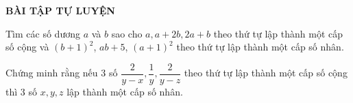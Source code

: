 \begin{center}
	\textbf{BÀI TẬP TỰ LUYỆN}
\end{center}
\begin{bt}%
	Tìm các số dương $a$ và $b$ sao cho $a, a+2b, 2a+b$ theo thứ tự lập thành một cấp số cộng và ${(b+1)}^2$, $ab+5$, ${(a+1)}^2$ theo thứ tự lập thành một cấp số nhân. 
\end{bt}
\begin{bt}%
	Chứng minh rằng nếu 3 số $\dfrac{2}{y-x}, \dfrac{1}{y}, \dfrac{2}{y-z}$ theo thứ tự lập thành một cấp số cộng thì 3 số $x, y, z$ lập thành một cấp số nhân. 
\end{bt}


